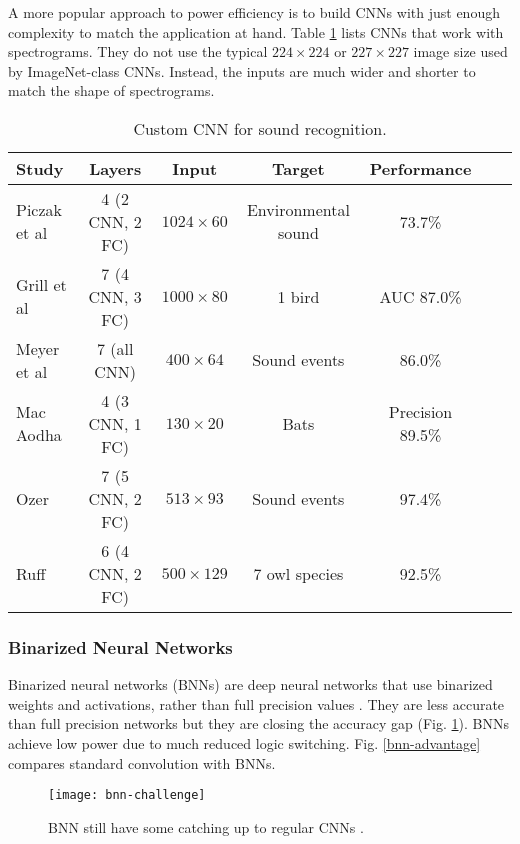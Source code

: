 A more popular approach to power efficiency is to build CNNs with just enough complexity to match the application at hand. Table \ref{customcnn} lists CNNs that work with spectrograms. They do not use the typical $224\times 224$ or $227\times 227$ image size used by ImageNet-class CNNs. Instead, the inputs are much wider and shorter to match the shape of spectrograms.



\begin{table}[H]
\renewcommand{\arraystretch}{1}
\small
\centering
\caption{Custom CNN for sound recognition.}
\label{customcnn}
\begin{tabular}{lcccccc}
\toprule
\textbf{Study} & \textbf{Layers} & \textbf{Input} & \textbf{Target} & \textbf{Performance} \\
\midrule
Piczak et al \cite{Piczak2015} & 4 (2 CNN, 2 FC) & $1024\times 60$ & Environmental sound & 73.7\% \\
Grill et al \cite{Grill2017} & 7 (4 CNN, 3 FC) & $1000\times 80$ & 1 bird & AUC 87.0\% \\
Meyer et al \cite{Meyer2017} & 7 (all CNN) & $400\times 64$ & Sound events & 86.0\% \\
Mac Aodha \cite{MacAodha2018} & 4 (3 CNN, 1 FC) & $130\times 20$  & Bats & Precision 89.5\% \\
Ozer \cite{Ozer2018} & 7 (5 CNN, 2 FC) & $513\times 93$ & Sound events & 97.4\% \\
Ruff \cite{Ruff2019} & 6 (4 CNN, 2 FC) & $500\times 129$ & 7 owl species & 92.5\% \\
\bottomrule
\end{tabular}
\end{table}


\subsubsection{Binarized Neural Networks}

Binarized neural networks (BNNs) are deep neural networks that use binarized weights and activations, rather than full precision values \cite{Courbariaux2015}.
They are less accurate than full precision networks but they are closing the accuracy gap (Fig. \ref{bnn-challenge}).
BNNs achieve low power due to much reduced logic switching.
Fig. \ref{bnn-advantage} compares standard convolution with BNNs.


\begin{figure}[H]
    \centering
    \texttt{[image: bnn-challenge]}
    \caption{BNN still have some catching up to regular CNNs \citep{Rastegari2016}.}
    \label{bnn-challenge}
\end{figure}



